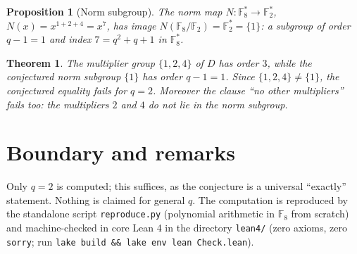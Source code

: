 \documentclass[11pt]{article}
\newtheorem*{prop}{Proposition}
\newtheorem*{thm}{Theorem}
\begin{document}
\begin{prop}[Norm subgroup]
The norm map $N : \mathbb{F}_8^* \to \mathbb{F}_2^*$,
$N(x) = x^{1+2+4} = x^7$, has image $N(\mathbb{F}_8/\mathbb{F}_2)
= \mathbb{F}_2^* = \{1\}$: a subgroup of order $q - 1 = 1$ and index
$7 = q^2+q+1$ in $\mathbb{F}_8^*$.
\end{prop}

\begin{thm}
The multiplier group $\{1,2,4\}$ of $D$ has order $3$, while the conjectured
norm subgroup $\{1\}$ has order $q-1 = 1$. Since $\{1,2,4\} \ne \{1\}$, the
conjectured equality fails for $q = 2$. Moreover the clause ``no other
multipliers'' fails too: the multipliers $2$ and $4$ do not lie in the norm
subgroup.
\end{thm}

\section{Boundary and remarks}

Only $q = 2$ is computed; this suffices, as the conjecture is a universal
``exactly'' statement. Nothing is claimed for general $q$. The computation is
reproduced by the standalone script \texttt{reproduce.py} (polynomial
arithmetic in $\mathbb{F}_8$ from scratch) and machine-checked in core Lean 4
in the directory \texttt{lean4/} (zero axioms, zero \texttt{sorry}; run
\texttt{lake build \&\& lake env lean Check.lean}).
\end{document}
